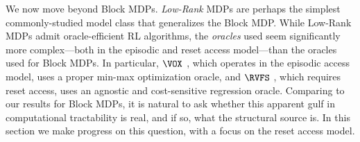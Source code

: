 \nc{\bphi}{\boldsymbol{\phi}}
\nc{\bast}{\ba^\st}
\nc{\Algbar}{\overline{\Alg}}
\nc{\MDnull}{\MD^\circ}
\nc{\MObar}{\ol\MO}
\nc{\phist}{\phi^\st}
\nc{\must}{\mu^\st}


\iffalse
A \emph{low-rank} MDP is an MDP where the transitions are linear in some unknown $d$-dimensional feature mapping $\phist: \MX\times\MA \to \RR^d$ that lies in some known function class, i.e.:
\[\BP_{h+1}(x_{h+1}|x_h,a_h) = \langle \phist_h(x_h,a_h), \must_{h+1}(x_{h+1})\rangle.\]
\fi 

We now move beyond Block MDPs. \emph{Low-Rank} MDPs \citep{modi2021model} are perhaps the simplest commonly-studied model class that generalizes the Block MDP.
While Low-Rank MDPs admit oracle-efficient RL algorithms, the \emph{oracles} used seem significantly more complex---both in the episodic and reset access model---than the oracles used for Block MDPs. In particular, $\VOX$ \citep{mhammedi2023efficient}, which operates in the episodic access model, uses a proper min-max optimization oracle, and $\RVFS$ \citep{mhammedi2024power}, which requires reset access, uses an agnostic and cost-sensitive regression oracle. Comparing to our results for Block MDPs, it is natural to ask whether this apparent gulf in computational tractability is real, and if so, what the structural source is. In this section we make progress on this question, with a focus on the reset access model.\loose

